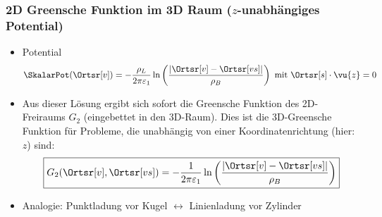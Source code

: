 \begin{frame}
  \frametitle{2D Greensche Funktion im 3D Raum ($z$-unabhängiges Potential)}
  \begin{itemize}[<+->]
  \item Potential
    \begin{equation*}
     \SkalarPot(\Ortsr[v]) = -\frac{\rho_L}{2\pi\varepsilon_1} \ln\left(\frac{\left|\Ortsr[v]-\Ortsr[vs]\right|}{\rho_B} \right) \text{ mit } \Ortsr[s]\cdot \vu{z} = 0
   \end{equation*}
 \item Aus dieser Lösung ergibt sich sofort die \alert{Greensche Funktion des 2D-Freiraums} $G_2$ (eingebettet in den 3D-Raum). Dies ist die 3D-Greensche Funktion für Probleme, die unabhängig von einer Koordinatenrichtung (hier: $z$) sind:
    \begin{equation*}
     \boxed{G_2(\Ortsr[v], \Ortsr[vs])= -\frac{1}{2\pi\varepsilon_1} \ln\left(\frac{\left|\Ortsr[v]-\Ortsr[vs]\right|}{\rho_B} \right) }
   \end{equation*}
   \item Analogie: Punktladung vor Kugel $\leftrightarrow$ Linienladung vor Zylinder
  \end{itemize}

  
  \end{frame}

